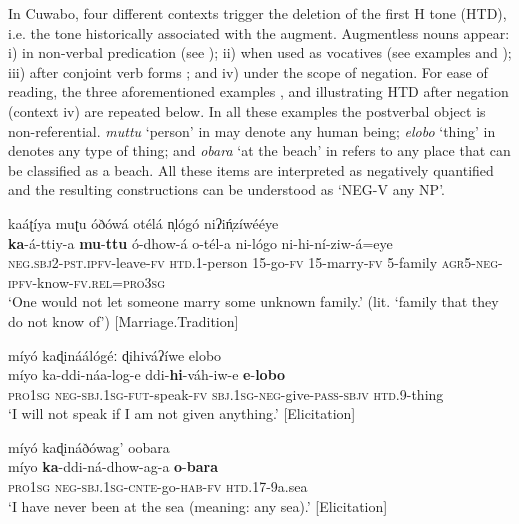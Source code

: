 \documentclass[output=paper,colorlinks=true, citecolor=brown,draftmode]{langscibook}
\begin{document}
In Cuwabo, four different contexts trigger the deletion of the first H tone (HTD), i.e. the tone historically associated with the augment. Augmentless nouns appear: i) in non-verbal predication (see ); ii) when used as vocatives (see examples  and ); iii) after conjoint verb forms ; and iv) under the scope of negation. For ease of reading, the three aforementioned examples ,  and  illustrating HTD after negation (context iv) are repeated below. In all these examples the postverbal object is non-referential. \textit{muttu} ‘person’ in  may denote any human being; \textit{elobo} ‘thing’ in  denotes any type of thing; and \textit{obara} ‘at the beach’ in  refers to any place that can be classified as a beach. All these items are interpreted as negatively quantified and the resulting constructions can be understood as ‘NEG-V any NP’.

\ea\label{ex:cuw:71} kaáʈíya muʈu óðówá otélá n̩lógó niʔiń̩zíwééye \\ 
    \gll \textbf{ka}{}-á-ttiy-a \textbf{mu}{}-\textbf{ttu} ó-dhow-á o-tél-a ni-lógo ni-hi-ní-ziw-á=eye \\
          \textsc{neg.sbj2-pst.ipfv-}leave{}-\textsc{fv} \textsc{htd.1}{}-person \textsc{15}{}-go-\textsc{fv} \textsc{15}{}-marry-\textsc{fv} \textsc{5}{}-family \textsc{agr}5-\textsc{neg-ipfv}{}-know-\textsc{fv.rel=pro3sg} \\
    \glt ‘One would not let someone marry some unknown family.’ (lit. ‘family that they do not know of’) [Marriage.Tradition]

\z 

{\ea\label{ex:cuw:72} míyó kaɖináálógéː ɖihiváʔíwe elobo \\
    \gll  míyo ka-ddi-náa-log{}-e ddi-\textbf{hi}{}-váh-iw-e \textbf{e}{}-\textbf{lobo}\\
          \textsc{pro1sg} \textsc{neg-sbj.1sg-fut}{}-speak-\textsc{fv} \textsc{sbj.1sg-neg-}give-\textsc{pass-sbjv} \textsc{htd.9}{}-thing \\
    \glt  ‘I will not speak if I am not given anything.’ [Elicitation]
\z }

\ea\label{ex:cuw:73} míyó kaɖináðówag’ oobara \\ 
    \gll míyo \textbf{ka}{}-ddi-ná-dhow-ag-a \textbf{o}{}-\textbf{bara}\\
          \textsc{pro1sg} \textsc{neg-sbj.1sg-cnte}{}-go-\textsc{hab-fv} \textsc{htd.17}{}-9a.sea \\
    \glt  ‘I have never been at the sea (meaning: any sea).’ [Elicitation]
\z 
\end{document}
